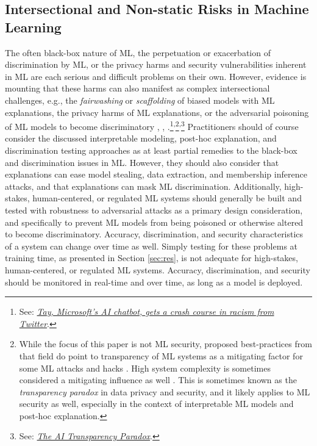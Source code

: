 \documentclass[information,article,submit,moreauthors,pdftex]{definitions/mdpi}
\begin{document}
\subsection{Intersectional and Non-static Risks in Machine Learning}

The often black-box nature of ML, the perpetuation or exacerbation of discrimination by ML, or the privacy harms and security vulnerabilities inherent in ML are each serious and difficult problems on their own. However, evidence is mounting that these harms can also manifest as complex intersectional challenges, e.g., the \textit{fairwashing} or \textit{scaffolding} of biased models with ML explanations, the privacy harms of ML explanations, or the adversarial poisoning of ML models to become discriminatory \cite{shokri2019privacy}, \cite{fair_washing}, \cite{scaffolding}.\footnote{See: \href{https://www.theguardian.com/technology/2016/mar/24/tay-microsofts-ai-chatbot-gets-a-crash-course-in-racism-from-twitter}{\textit{Tay, Microsoft's AI chatbot, gets a crash course in racism from Twitter}}.}\textsuperscript{,}\footnote{While the focus of this paper is not ML security, proposed best-practices from that field do point to transparency of ML systems as a mitigating factor for some ML attacks and hacks \cite{papernot2018marauder}. High system complexity is sometimes considered a mitigating influence as well \cite{hoare19811980}. This is sometimes known as the \textit{transparency paradox} in data privacy and security, and it likely applies to ML security as well, especially in the context of interpretable ML models and post-hoc explanation.}\textsuperscript{,}\footnote{See: \href{https://hbr.org/2019/12/the-ai-transparency-paradox}{\textit{The AI Transparency Paradox}}.} Practitioners should of course consider the discussed interpretable modeling, post-hoc explanation, and discrimination testing approaches as at least partial remedies to the black-box and discrimination issues in ML. However, they should also consider that explanations can ease model stealing, data extraction, and membership inference attacks, and that explanations can mask ML discrimination. Additionally, high-stakes, human-centered, or regulated ML systems should generally be built and tested with robustness to adversarial attacks as a primary design consideration, and specifically to prevent ML models from being poisoned or otherwise altered to become discriminatory. Accuracy, discrimination, and security characteristics of a system can change over time as well. Simply testing for these problems at training time, as presented in Section \ref{sec:res}, is not adequate for high-stakes, human-centered, or regulated ML systems. Accuracy, discrimination, and security should be monitored in real-time and over time, as long as a model is deployed.
\end{document}
